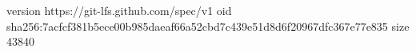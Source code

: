 version https://git-lfs.github.com/spec/v1
oid sha256:7acfcf381b5ece00b985daeaf66a52cbd7c439e51d8d6f20967dfc367e77e835
size 43840
